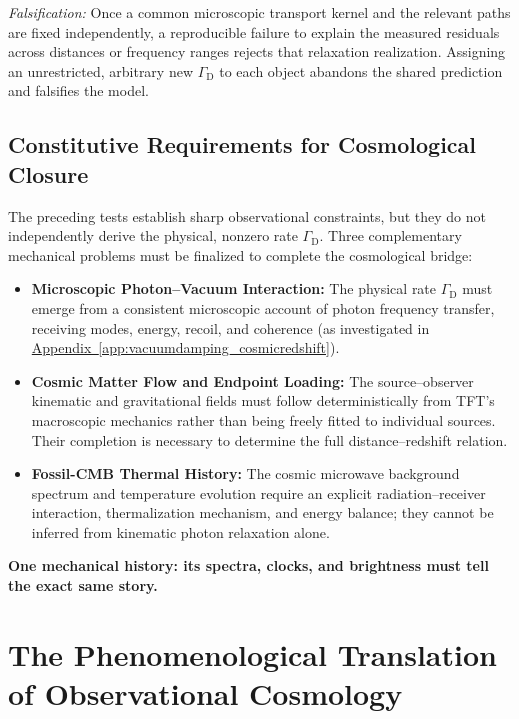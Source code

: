 \begin{itemize}
    \textit{Falsification:} Once a common microscopic transport kernel and the relevant paths are fixed independently, a reproducible failure to explain the measured residuals across distances or frequency ranges rejects that relaxation realization. Assigning an unrestricted, arbitrary new $\Gamma_{\mathrm D}$ to each object abandons the shared prediction and falsifies the model.
\end{itemize}

\subsection*{Constitutive Requirements for Cosmological Closure}

The preceding tests establish sharp observational constraints, but they do not independently derive the physical, nonzero rate $\Gamma_{\mathrm D}$. Three complementary mechanical problems must be finalized to complete the cosmological bridge:

\begin{itemize}
    \item \textbf{Microscopic Photon--Vacuum Interaction:} The physical rate $\Gamma_{\mathrm D}$ must emerge from a consistent microscopic account of photon frequency transfer, receiving modes, energy, recoil, and coherence (as investigated in \hyperref[app:vacuumdamping_cosmicredshift]{Appendix~\ref*{app:vacuumdamping_cosmicredshift}}).
    
    \item \textbf{Cosmic Matter Flow and Endpoint Loading:} The source--observer kinematic and gravitational fields must follow deterministically from TFT's macroscopic mechanics rather than being freely fitted to individual sources. Their completion is necessary to determine the full distance--redshift relation.
    
    \item \textbf{Fossil-CMB Thermal History:} The cosmic microwave background spectrum and temperature evolution require an explicit radiation--receiver interaction, thermalization mechanism, and energy balance; they cannot be inferred from kinematic photon relaxation alone.
\end{itemize}

\medskip
\noindent\textbf{One mechanical history: its spectra, clocks, and brightness must tell the exact same story.}

\section{The Phenomenological Translation of Observational Cosmology}

